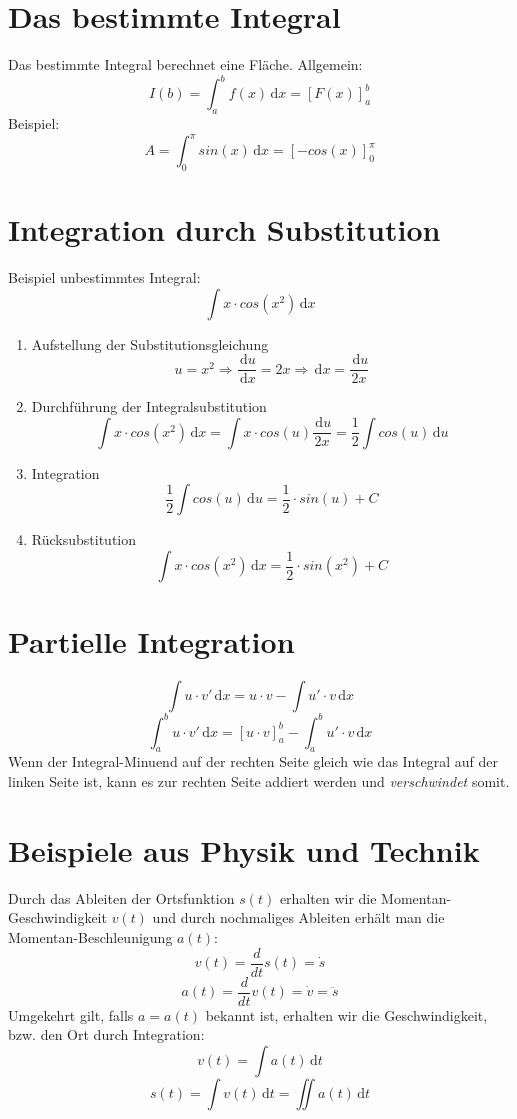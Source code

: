 \section{Das bestimmte Integral} %
\label{sub:das_bestimmte_integral}
Das bestimmte Integral berechnet eine Fläche.\newline
Allgemein:
\[ I(b) = \int_a^b f(x) \,\mathrm{d}x = [F(x)]_a^b \]
Beispiel:
\[ A = \int_0^{\pi} sin(x)\,\mathrm{d}x = [-cos(x)]_0^{\pi} \]

\section{Integration durch Substitution} %
\label{sec:integration_durch_substitution}
Beispiel unbestimmtes Integral:
\[ \int x \cdot cos(x^2)\,\mathrm{d}x\]
\begin{enumerate}
	\item Aufstellung der Substitutionsgleichung
	\[u = x^2 \Rightarrow \frac{\,\mathrm{d}u}{\,\mathrm{d}x} = 2x \Rightarrow \,\mathrm{d}x = \frac{\,\mathrm{d}u}{2x} \]
	\item Durchführung der Integralsubstitution
	\[\int x \cdot cos(x^2)\,\mathrm{d}x = \int x \cdot cos(u) \frac{\,\mathrm{d}u}{2x} = \frac{1}{2} \int cos(u)\,\mathrm{d}u \]
	\item Integration
	\[\frac{1}{2} \int cos(u)\,\mathrm{d}u = \frac{1}{2} \cdot sin(u) + C\]
	\item Rücksubstitution
	\[ \int x \cdot cos(x^2)\,\mathrm{d}x = \frac{1}{2} \cdot sin(x^2) + C\]
\end{enumerate}

\section{Partielle Integration} %
\label{sec:partielle_integration}
\[ \int u \cdot v'\,\mathrm{d}x = u \cdot v - \int u' \cdot v\,\mathrm{d}x \]
\[ \int_a^b u \cdot v'\,\mathrm{d}x = [u \cdot v]_a^b - \int_a^b u' \cdot v\,\mathrm{d}x \]
Wenn der Integral-Minuend auf der rechten Seite gleich wie das Integral auf der linken Seite ist, kann es zur rechten Seite addiert werden und \emph{verschwindet} somit.

\section{Beispiele aus Physik und Technik} %
\label{sec:beispiele_aus_physik_und_technik}
Durch das Ableiten der Ortsfunktion \( s(t) \) erhalten wir die Momentan-Geschwindigkeit \(v(t)\) und durch nochmaliges Ableiten erhält man die Momentan-Beschleunigung \(a(t)\):
\[ v(t) = \frac { d }{ dt } s(t) = \dot { s } \]
\[ a(t) = \frac { d }{ dt } v(t) = \dot { v } = \ddot{s}\]
Umgekehrt gilt, falls \( a = a(t) \) bekannt ist, erhalten wir die Geschwindigkeit, bzw. den Ort durch Integration:
\[ v(t) = \int a(t)\,\mathrm{d}t \]
\[ s(t) = \int v(t)\,\mathrm{d}t = \iint a(t)\,\mathrm{d}t\]

